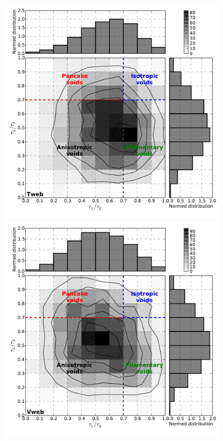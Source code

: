 \documentclass[a4,useAMS,usenatbib,usegraphicx]{latex/mn2e}
\begin{document}
\begin{flushleft}
\begin{figure}
\begin{center}
  \includegraphics[trim = 7mm 9mm 1mm 0mm, clip, keepaspectratio=true,
  width=0.36\textheight]{./figures/voids_inertia_tensor_Tweb}
  \includegraphics[trim = 7mm 9mm 1mm 0mm, clip, keepaspectratio=true,
  width=0.36\textheight]{./figures/voids_inertia_tensor_Vweb}


\end{center}
\end{figure}
\end{flushleft}
\end{document}

